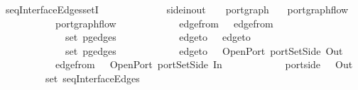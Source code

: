 \ seqInterfaceEdges{\isacharunderscore}setI{\isacharcolon}\isanewline
\ \ \ \ \ \ \ \ \ \ {\isacharcolon}{\isacharcolon}\ {\isachardoublequoteopen}{\isacharparenleft}\ {\isacharcolon}{\isacharcolon}\ side{\isacharunderscore}in{\isacharunderscore}out{\isacharcomma}\ \ \ \ port{\isacharunderscore}graph{\isachardoublequoteclose}\isanewline
\ \ \ {\isachardoublequoteopen}port{\isacharunderscore}graph{\isacharunderscore}flow\ \isanewline
\ \ \ \ \ \ \ \ \ \ \ {\isachardoublequoteopen}port{\isacharunderscore}graph{\isacharunderscore}flow\ \isanewline
\ \ \ \ \ \ \ \ \ \ \ {\isachardoublequoteopen}edge{\isacharunderscore}from\ \ {\isacharequal}\ edge{\isacharunderscore}from\ \isanewline
\ \ \ \ \ \ \ \ \ \ \ {\isachardoublequoteopen}\ {\isasymin}\ set\ {\isacharparenleft}pg{\isacharunderscore}edges\ \isanewline
\ \ \ \ \ \ \ \ \ \ \ {\isachardoublequoteopen}edge{\isacharunderscore}to\ \ {\isacharequal}\ edge{\isacharunderscore}to\ \isanewline
\ \ \ \ \ \ \ \ \ \ \ {\isachardoublequoteopen}\ {\isasymin}\ set\ {\isacharparenleft}pg{\isacharunderscore}edges\ \isanewline
\ \ \ \ \ \ \ \ \ \ \ {\isachardoublequoteopen}edge{\isacharunderscore}to\ \ {\isacharequal}\ OpenPort\ {\isacharparenleft}portSetSide\ Out\ \isanewline
\ \ \ \ \ \ \ \ \ \ \ {\isachardoublequoteopen}edge{\isacharunderscore}from\ \ {\isacharequal}\ OpenPort\ {\isacharparenleft}portSetSide\ In\ \isanewline
\ \ \ \ \ \ \ \ \ \ \ {\isachardoublequoteopen}port{\isachardot}side\ \ \isacharequal\ Out{\isachardoublequoteclose}\isanewline
\ \ \ \ \ \ \ {\isachardoublequoteopen}\ {\isasymin}\ set\ {\isacharparenleft}seqInterfaceEdges\ 
